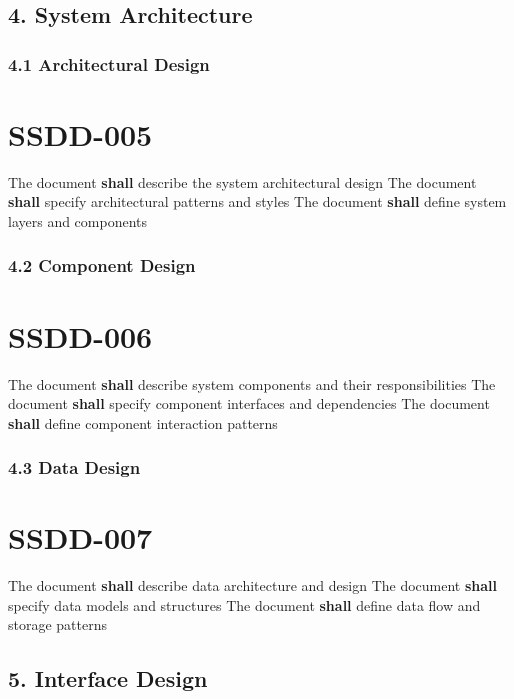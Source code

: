 \subsection{4. System Architecture}

\subsubsection{4.1 Architectural Design}

\section{SSDD-005}\label{SSDD-005}

The document \textbf{shall} describe the system architectural design
The document \textbf{shall} specify architectural patterns and styles
The document \textbf{shall} define system layers and components

\subsubsection{4.2 Component Design}

\section{SSDD-006}\label{SSDD-006}

The document \textbf{shall} describe system components and their responsibilities
The document \textbf{shall} specify component interfaces and dependencies
The document \textbf{shall} define component interaction patterns

\subsubsection{4.3 Data Design}

\section{SSDD-007}\label{SSDD-007}

The document \textbf{shall} describe data architecture and design
The document \textbf{shall} specify data models and structures
The document \textbf{shall} define data flow and storage patterns

\subsection{5. Interface Design}

